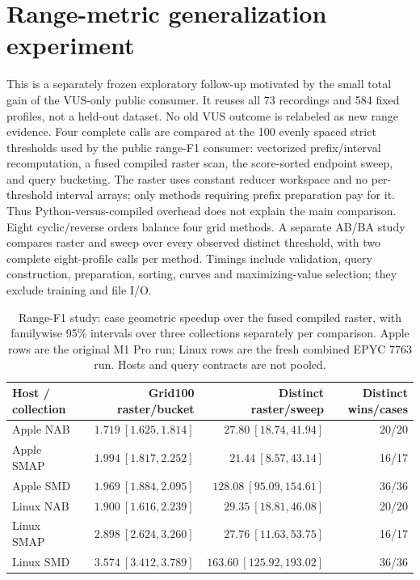 \section{Range-metric generalization experiment}
This is a separately frozen exploratory follow-up motivated by the small total
gain of the VUS-only public consumer. It reuses all 73 recordings and 584 fixed
profiles, not a held-out dataset. No old VUS outcome is relabeled as new range
evidence. Four complete calls are compared at the 100 evenly spaced strict
thresholds used by the public range-F1 consumer: vectorized prefix/interval
recomputation, a fused compiled raster scan, the score-sorted endpoint sweep,
and query bucketing. The raster uses constant reducer workspace and no
per-threshold interval arrays; only methods requiring prefix preparation pay
for it. Thus Python-versus-compiled overhead does not explain the main comparison.
Eight cyclic/reverse orders balance four grid methods. A separate AB/BA study
compares raster and sweep over every observed distinct threshold, with two
complete eight-profile calls per method. Timings include validation, query
construction, preparation, sorting, curves and maximizing-value selection;
they exclude training and file I/O.

\begin{table}[t]
\centering\small
\caption{Range-F1 study: case geometric speedup over the fused compiled
raster, with familywise 95\% intervals over three collections separately per
comparison. Apple rows are the original M1 Pro run; Linux rows are the
fresh combined EPYC 7763 run. Hosts and query contracts are not pooled.}
\label{tab:range-sweep}
\begin{tabular}{lrrr}
\toprule
Host / collection & Grid100 raster/bucket & Distinct raster/sweep & Distinct wins/cases\\
\midrule
Apple NAB & $1.719\ [1.625,1.814]$ & $27.80\ [18.74,41.94]$ & 20/20\\
Apple SMAP & $1.994\ [1.817,2.252]$ & $21.44\ [8.57,43.14]$ & 16/17\\
Apple SMD & $1.969\ [1.884,2.095]$ & $128.08\ [95.09,154.61]$ & 36/36\\
\midrule
Linux NAB & $1.900\ [1.616,2.239]$ & $29.35\ [18.81,46.08]$ & 20/20\\
Linux SMAP & $2.898\ [2.624,3.260]$ & $27.76\ [11.63,53.75]$ & 16/17\\
Linux SMD & $3.574\ [3.412,3.789]$ & $163.60\ [125.92,193.02]$ & 36/36\\
\bottomrule
\end{tabular}
\end{table}


